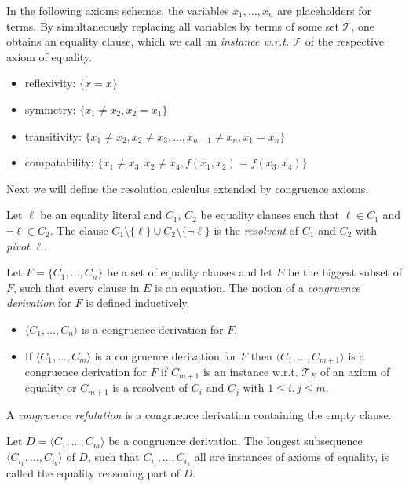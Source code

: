 \begin{definition}

In the following axioms schemas, the variables $x_1,\ldots,x_n$ are placeholders for terms.
By simultaneously replacing all variables by terms of some set $\mathcal{T}$, one obtains an equality clause, which we call an \emph{instance w.r.t. $\mathcal{T}$} of the respective axiom of equality.

\begin{itemize}
	\item reflexivity: $\{x = x\}$
	\item symmetry: $\{x_1 \neq x_2, x_2 = x_1\}$
	\item transitivity: $\{x_1 \neq x_2, x_2 \neq x_3, \ldots, x_{n-1} \neq x_n, x_1 = x_n\}$
	\item compatability: $\{x_1 \neq x_3, x_2 \neq x_4, f(x_1,x_2) = f(x_3,x_4)\}$
\end{itemize}

\end{definition}

Next we will define the resolution calculus extended by congruence axioms.

\begin{definition}

Let $\ell$ be an equality literal and $C_1$, $C_2$ be equality clauses such that $\ell \in C_1$ and $\neg \ell \in C_2$.
The clause $C_1 \setminus \{\ell\} \cup C_2 \setminus \{\neg \ell\}$ is the \emph{resolvent} of $C_1$ and $C_2$ with \emph{pivot} $\ell$.

\noindent Let $F = \{C_1, \ldots, C_n\}$ be a set of equality clauses and let $E$ be the biggest subset of $F$, such that every clause in $E$ is an equation.
The notion of a \emph{congruence derivation} for $F$ is defined inductively.
\begin{itemize}
	\item $\langle C_1, \ldots, C_n\rangle$ is a congruence derivation for $F$.
	\item If $\langle C_1, \ldots, C_m\rangle$ is a congruence derivation for $F$ then $\langle C_1, \ldots, C_{m+1} \rangle$ is a congruence derivation for $F$ if $C_{m+1}$ is an instance w.r.t. $\mathcal{T}_E$ of an axiom of equality or $C_{m+1}$ is a resolvent of $C_i$ and $C_j$ with $1 \leq i,j \leq m$.
\end{itemize}
A \emph{congruence refutation} is a congruence derivation containing the empty clause.

\noindent Let $D = \langle C_1, \ldots, C_m\rangle$ be a congruence derivation.
The longest subsequence $\langle C_{i_1}, \ldots, C_{i_k}\rangle$ of $D$, such that $C_{i_1}, \ldots, C_{i_k}$ all are instances of axioms of equality, is called the equality reasoning part of $D$.

\end{definition}

